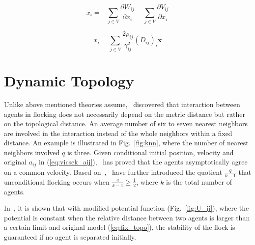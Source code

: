 \begin{equation}\label{eq:connect}
\dot{x}_i=-\sum_{j\in V}\frac{\partial W_{ij}}{\partial x_i}-\sum_{j\in V}\frac{\partial V_{ij}}{\partial x_i}
\end{equation}

\begin{equation}\label{eq:unbound}
\dot{x}_i=\sum_{j\in V}\frac{2\rho_{ij}}{\gamma_{ij}^2}(D_{ij})_i\mathbf{x}
\end{equation}

\section{Dynamic Topology}

Unlike above mentioned theories assume,~\cite{PNAS} discovered that interaction between agents in flocking does not necessarily depend on the metric distance but rather on the topological distance. An average number of six to seven nearest neighbors are involved in the interaction instead of the whole neighbors within a fixed distance. An example is illustrated in Fig.~\ref{fig:knn}, where the number of nearest neighbors involved $q$ is three. Given conditional initial position, velocity and original $a_{ij}$ in (\ref{eq:vicsek_aij}),~\cite{KNN} has proved that the agents asymptotically agree on a common velocity. Based on~\cite{KNN},~\cite{CuckerDong2016} have further introduced the quotient $\frac{q}{k-1}$ that unconditional flocking occurs when $\frac{q}{k-1}\geq\frac{1}{2}$, where $k$ is the total number of agents.

In~\cite{DynamicTopology}, it is shown that with modified potential function (Fig.~\ref{fig:U_ij}), where the potential is constant when the relative distance between two agents is larger than a certain limit and original model (\ref{eq:fix_topo}), the stability of the flock is guaranteed if no agent is separated initially.


